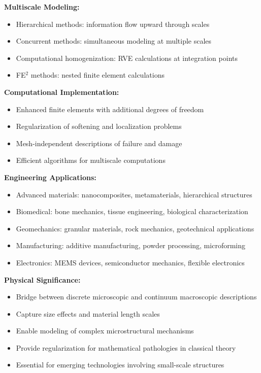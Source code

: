 \begin{subox}[Summary]
\textbf{Multiscale Modeling:}
\begin{itemize}
\item Hierarchical methods: information flow upward through scales
\item Concurrent methods: simultaneous modeling at multiple scales
\item Computational homogenization: RVE calculations at integration points
\item FE$^2$ methods: nested finite element calculations
\end{itemize}

\textbf{Computational Implementation:}
\begin{itemize}
\item Enhanced finite elements with additional degrees of freedom
\item Regularization of softening and localization problems
\item Mesh-independent descriptions of failure and damage
\item Efficient algorithms for multiscale computations
\end{itemize}

\textbf{Engineering Applications:}
\begin{itemize}
\item Advanced materials: nanocomposites, metamaterials, hierarchical structures
\item Biomedical: bone mechanics, tissue engineering, biological characterization
\item Geomechanics: granular materials, rock mechanics, geotechnical applications
\item Manufacturing: additive manufacturing, powder processing, microforming
\item Electronics: MEMS devices, semiconductor mechanics, flexible electronics
\end{itemize}

\textbf{Physical Significance:}
\begin{itemize}
\item Bridge between discrete microscopic and continuum macroscopic descriptions
\item Capture size effects and material length scales
\item Enable modeling of complex microstructural mechanisms
\item Provide regularization for mathematical pathologies in classical theory
\item Essential for emerging technologies involving small-scale structures
\end{itemize}


\end{subox}
